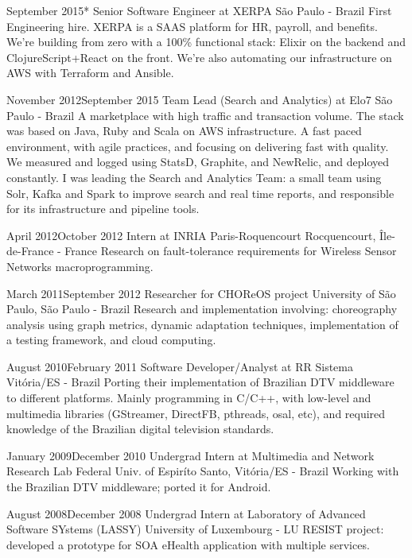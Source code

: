 \documentclass{friggeri-cv}
\begin{document}
\workentry
    {September 2015}{*}
    {Senior Software Engineer at XERPA}
    {São Paulo - Brazil}
    {First Engineering hire. XERPA is a SAAS platform for HR, payroll, and benefits. We're building from zero with a 100\% functional stack: Elixir on the backend and ClojureScript+React on the front. We're also automating our infrastructure on AWS with Terraform and Ansible.}

\workentry
  {November 2012}{September 2015}
  {Team Lead (Search and Analytics) at Elo7}
  {São Paulo - Brazil}
  {A marketplace with high traffic and transaction volume. The stack was based on Java, Ruby and Scala on AWS infrastructure. A fast paced environment, with agile practices, and focusing on delivering fast with quality. We measured and logged using StatsD, Graphite, and NewRelic, and deployed constantly. I was leading the Search and Analytics Team: a small team using Solr, Kafka and Spark to improve search and real time reports, and responsible for its infrastructure and pipeline tools.}

\workentry
  {April 2012}{October 2012}
  {Intern at INRIA Paris-Roquencourt}
  {Rocquencourt, Île-de-France - France}
  {Research on fault-tolerance requirements for Wireless Sensor Networks macroprogramming.}

\workentry
  {March 2011}{September 2012}
  {Researcher for CHOReOS project}
  {University of São Paulo, São Paulo - Brazil}
  {Research and implementation involving: choreography analysis using graph metrics,
  dynamic adaptation techniques, implementation of a testing framework, and cloud computing.}

\workentry
  {August 2010}{February 2011}
  {Software Developer/Analyst at RR Sistema}
  {Vitória/ES - Brazil}
  {Porting their implementation of Brazilian DTV middleware to different platforms.
  Mainly programming in C/C++, with low-level and multimedia libraries (GStreamer, DirectFB, pthreads, osal, etc),
  and required knowledge of the Brazilian digital television standards.}

\workentry
  {January 2009}{December 2010}
  {Undergrad Intern at Multimedia and Network Research Lab}
  {Federal Univ. of Espiríto Santo, Vitória/ES - Brazil}
  {Working with the Brazilian DTV middleware; ported it for Android. }

\workentry
  {August 2008}{December 2008}
  {Undergrad Intern at Laboratory of Advanced Software SYstems (LASSY)}
  {University of Luxembourg - LU}
  {RESIST project: developed a prototype for SOA eHealth application with multiple services.}
\end{document}
